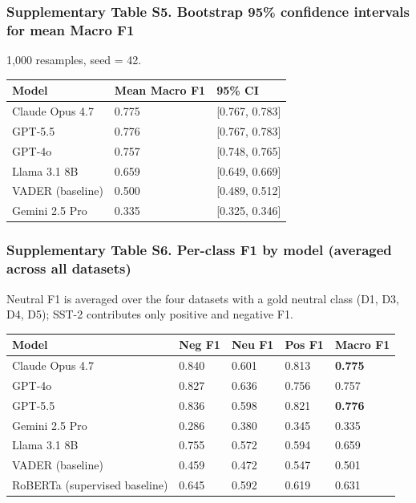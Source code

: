 \documentclass[11pt]{article}
\begin{document}
\subsubsection{Supplementary Table S5. Bootstrap 95\% confidence
intervals for mean Macro
F1}\label{supplementary-table-s5.-bootstrap-95-confidence-intervals-for-mean-macro-f1}

1,000 resamples, seed = 42.

\begin{longtable}[]{@{}lll@{}}
\toprule\noalign{}
Model & Mean Macro F1 & 95\% CI \\
\midrule\noalign{}
\endhead
\bottomrule\noalign{}
\endlastfoot
Claude Opus 4.7 & 0.775 & {[}0.767, 0.783{]} \\
GPT-5.5 & 0.776 & {[}0.767, 0.783{]} \\
GPT-4o & 0.757 & {[}0.748, 0.765{]} \\
Llama 3.1 8B & 0.659 & {[}0.649, 0.669{]} \\
VADER (baseline) & 0.500 & {[}0.489, 0.512{]} \\
Gemini 2.5 Pro & 0.335 & {[}0.325, 0.346{]} \\
\end{longtable}

\subsubsection{Supplementary Table S6. Per-class F1 by model (averaged
across all
datasets)}\label{supplementary-table-s6.-per-class-f1-by-model-averaged-across-all-datasets}

Neutral F1 is averaged over the four datasets with a gold neutral class
(D1, D3, D4, D5); SST-2 contributes only positive and negative F1.

\begin{longtable}[]{@{}lllll@{}}
\toprule\noalign{}
Model & Neg F1 & Neu F1 & Pos F1 & Macro F1 \\
\midrule\noalign{}
\endhead
\bottomrule\noalign{}
\endlastfoot
Claude Opus 4.7 & 0.840 & 0.601 & 0.813 & \textbf{0.775} \\
GPT-4o & 0.827 & 0.636 & 0.756 & 0.757 \\
GPT-5.5 & 0.836 & 0.598 & 0.821 & \textbf{0.776} \\
Gemini 2.5 Pro & 0.286 & 0.380 & 0.345 & 0.335 \\
Llama 3.1 8B & 0.755 & 0.572 & 0.594 & 0.659 \\
VADER (baseline) & 0.459 & 0.472 & 0.547 & 0.501 \\
RoBERTa (supervised baseline) & 0.645 & 0.592 & 0.619 & 0.631 \\
\end{longtable}
\end{document}
